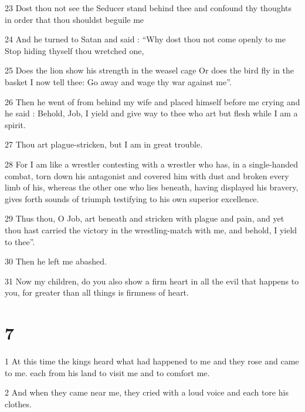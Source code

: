 \par 23 Dost thou not see the Seducer stand behind thee and confound thy thoughts in order that thou shouldst beguile me

\par 24 And he turned to Satan and said : “Why dost thou not come openly to me Stop hiding thyself thou wretched one,

\par 25 Does the lion show his strength in the weasel cage Or does the bird fly in the basket I now tell thee: Go away and wage thy war against me”.

\par 26 Then he went of from behind my wife and placed himself before me crying and he said : Behold, Job, I yield and give way to thee who art but flesh while I am a spirit.

\par 27 Thou art plague-stricken, but I am in great trouble.

\par 28 For I am like a wrestler contesting with a wrestler who has, in a single-handed combat, torn down his antagonist and covered him with dust and broken every limb of his, whereas the other one who lies beneath, having displayed his bravery, gives forth sounds of triumph testifying to his own superior excellence.

\par 29 Thus thou, O Job, art beneath and stricken with plague and pain, and yet thou hast carried the victory in the wrestling-match with me, and behold, I yield to thee”. 

\par 30 Then he left me abashed.

\par 31 Now my children, do you also show a firm heart in all the evil that happens to you, for greater than all things is firmness of heart.

\chapter{7}

\par 1 At this time the kings heard what had happened to me and they rose and came to me. each from his land to visit me and to comfort me. 

\par 2 And when they came near me, they cried with a loud voice and each tore his clothes.

